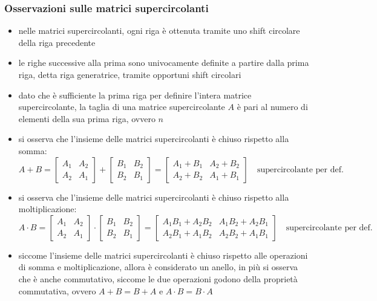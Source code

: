 \subsubsection*{Osservazioni sulle matrici supercircolanti}
\begin{itemize}
	\item nelle matrici supercircolanti, ogni riga è ottenuta tramite uno shift circolare della riga precedente
	\item le righe successive alla prima sono univocamente definite a partire dalla prima riga, detta riga generatrice,
	tramite opportuni shift circolari
	\item dato che è sufficiente la prima riga per definire l'intera matrice supercircolante, la taglia di una matrice
	supercircolante \(A\) è pari al numero di elementi della sua prima riga, ovvero \(n\)
	\item si osserva che l'insieme delle matrici supercircolanti è chiuso rispetto alla somma:
	\[A + B = \begin{bmatrix} A_1 & A_2 \\ A_2 & A_1 \end{bmatrix} + \begin{bmatrix} B_1 & B_2 \\ B_2 & B_1 \end{bmatrix} = \begin{bmatrix} A_1 + B_1 & A_2 + B_2 \\ A_2 + B_2 & A_1 + B_1 \end{bmatrix} \quad \text{supercircolante per def.}\]
	\item si osserva che l'insieme delle matrici supercircolanti è chiuso rispetto alla moltiplicazione:
	\[A \cdot B = \begin{bmatrix} A_1 & A_2 \\ A_2 & A_1 \end{bmatrix} \cdot \begin{bmatrix} B_1 & B_2 \\ B_2 & B_1 \end{bmatrix} = \begin{bmatrix} A_1 B_1 + A_2 B_2 & A_1 B_2 + A_2 B_1 \\ A_2 B_1 + A_1 B_2 & A_2 B_2 + A_1 B_1 \end{bmatrix} \quad \text{supercircolante per def.}\]
	\item siccome l'insieme delle matrici supercircolanti è chiuso rispetto alle operazioni di somma e moltiplicazione, allora
	è considerato un anello, in più si osserva che è anche commutativo, siccome le due operazioni godono della proprietà
	commutativa, ovvero \(A + B = B + A\) e \(A \cdot B = B \cdot A\)
\end{itemize}

